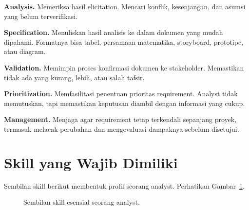 \documentclass[11pt,a4paper]{article}
\begin{document}
\textbf{Analysis.} Memeriksa hasil elicitation. Mencari konflik, kesenjangan, dan asumsi yang belum terverifikasi.

\textbf{Specification.} Menuliskan hasil analisis ke dalam dokumen yang mudah dipahami. Formatnya bisa tabel, persamaan matematika, storyboard, prototipe, atau diagram.

\textbf{Validation.} Memimpin proses konfirmasi dokumen ke stakeholder. Memastikan tidak ada yang kurang, lebih, atau salah tafsir.

\textbf{Prioritization.} Memfasilitasi penentuan prioritas requirement. Analyst tidak memutuskan, tapi memastikan keputusan diambil dengan informasi yang cukup.

\textbf{Management.} Menjaga agar requirement tetap terkendali sepanjang proyek, termasuk melacak perubahan dan mengevaluasi dampaknya sebelum disetujui.

\section{Skill yang Wajib Dimiliki}

Sembilan skill berikut membentuk profil seorang analyst. Perhatikan Gambar~\ref{fig:skills}.

\begin{figure}[H]
	\centering
	\caption{Sembilan skill esensial seorang analyst.}
	\label{fig:skills}
\end{figure}
\end{document}
